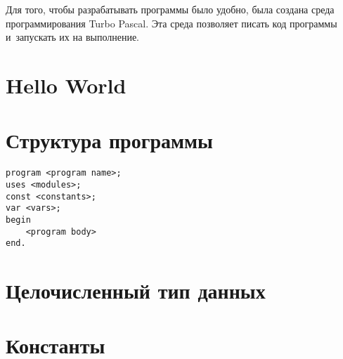 \documentclass[12pt,russian]{article}
\begin{document}
Для того, чтобы разрабатывать программы было удобно, была создана среда
программирования Turbo Pascal. Эта среда позволяет писать код программы
и~запускать их на выполнение.

\section{Hello World}

\section{Структура программы}
\begin{lstlisting}
program <program name>;
uses <modules>;
const <constants>;
var <vars>;
begin
    <program body>
end.
\end{lstlisting}

\section{Целочисленный тип данных}

\section{Константы}
\end{document}
